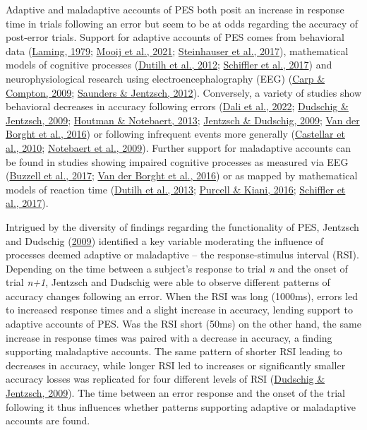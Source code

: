 \documentclass[
  man,floatsintext]{apa7}
\begin{document}
Adaptive and maladaptive accounts of PES both posit an increase in response time in trials following an error but seem to be at odds regarding the accuracy of post-error trials. Support for adaptive accounts of PES comes from behavioral data (\protect\hyperlink{ref-laming1979}{Laming, 1979}; \protect\hyperlink{ref-mooji2021}{Mooij et al., 2021}; \protect\hyperlink{ref-steinhauser2017}{Steinhauser et al., 2017}), mathematical models of cognitive processes (\protect\hyperlink{ref-dutilh2012testing}{Dutilh et al., 2012}; \protect\hyperlink{ref-schiffler2017}{Schiffler et al., 2017}) and neurophysiological research using electroencephalography (EEG) (\protect\hyperlink{ref-carp2009}{Carp \& Compton, 2009}; \protect\hyperlink{ref-saunders2012}{Saunders \& Jentzsch, 2012}). Conversely, a variety of studies show behavioral decreases in accuracy following errors (\protect\hyperlink{ref-dali2022error}{Dali et al., 2022}; \protect\hyperlink{ref-dudschig2009}{Dudschig \& Jentzsch, 2009}; \protect\hyperlink{ref-houtman2013}{Houtman \& Notebaert, 2013}; \protect\hyperlink{ref-jentzsch2009}{Jentzsch \& Dudschig, 2009}; \protect\hyperlink{ref-vanderborght2016errors}{Van der Borght et al., 2016}) or following infrequent events more generally (\protect\hyperlink{ref-castellar2010}{Castellar et al., 2010}; \protect\hyperlink{ref-notebaert2009}{Notebaert et al., 2009}). Further support for maladaptive accounts can be found in studies showing impaired cognitive processes as measured via EEG (\protect\hyperlink{ref-buzzel2017}{Buzzell et al., 2017}; \protect\hyperlink{ref-vanderborght2016errors}{Van der Borght et al., 2016}) or as mapped by mathematical models of reaction time (\protect\hyperlink{ref-dutilh2013}{Dutilh et al., 2013}; \protect\hyperlink{ref-purcell2016}{Purcell \& Kiani, 2016}; \protect\hyperlink{ref-schiffler2017}{Schiffler et al., 2017}).

Intrigued by the diversity of findings regarding the functionality of PES, Jentzsch and Dudschig (\protect\hyperlink{ref-jentzsch2009}{2009}) identified a key variable moderating the influence of processes deemed adaptive or maladaptive -- the response-stimulus interval (RSI). Depending on the time between a subject's response to trial \emph{n} and the onset of trial \emph{n+1}, Jentzsch and Dudschig were able to observe different patterns of accuracy changes following an error. When the RSI was long (1000ms), errors led to increased response times and a slight increase in accuracy, lending support to adaptive accounts of PES. Was the RSI short (50ms) on the other hand, the same increase in response times was paired with a decrease in accuracy, a finding supporting maladaptive accounts. The same pattern of shorter RSI leading to decreases in accuracy, while longer RSI led to increases or significantly smaller accuracy losses was replicated for four different levels of RSI (\protect\hyperlink{ref-dudschig2009}{Dudschig \& Jentzsch, 2009}). The time between an error response and the onset of the trial following it thus influences whether patterns supporting adaptive or maladaptive accounts are found.
\end{document}
